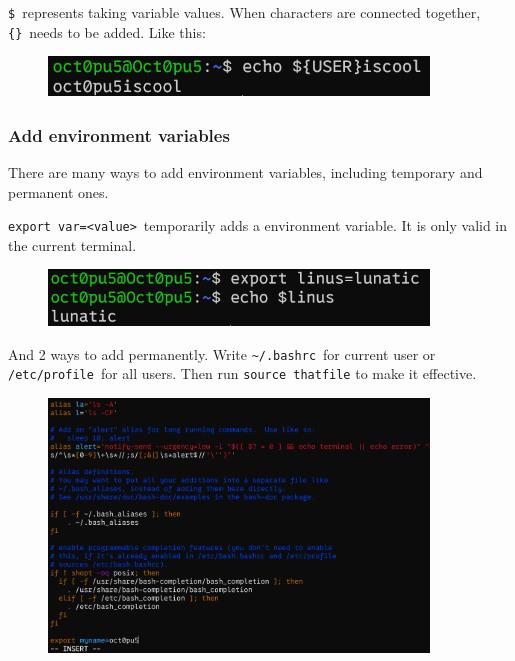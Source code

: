 \documentclass[12pt]{ctexart}
\begin{document}
\texttt{\$}\ represents taking variable values. When characters are
connected together, \texttt{\{\}}\ needs to be added. Like this:

\begin{figure}[H]
    \centering
    \includegraphics[width=0.9\textwidth,keepaspectratio]{assets/Linux/1.11 Linux environment variables/2.png}
\end{figure}

\subsubsection{\textbf{Add environment variables}}

There are many ways to add environment variables, including temporary
and permanent ones.

\texttt{export\ var=\textless{}value\textgreater{}}\ temporarily adds a
environment variable. It is only valid in the current terminal.

\begin{figure}[H]
    \centering
    \includegraphics[width=0.9\textwidth,keepaspectratio]{assets/Linux/1.11 Linux environment variables/3.png}
\end{figure}

And 2 ways to add permanently. Write \texttt{\textasciitilde{}/.bashrc}\
for current user or \texttt{/etc/profile}\ for all users. Then run
\texttt{source\ thatfile} to make it effective.

\begin{figure}[H]
    \centering
    \includegraphics[width=0.9\textwidth,keepaspectratio]{assets/Linux/1.11 Linux environment variables/4.png}
\end{figure}
\end{document}
